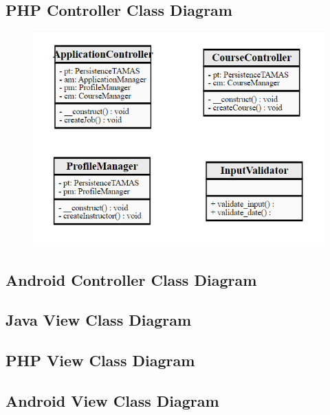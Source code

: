 \documentclass[12pt]{article}
\begin{document}
\subsection{PHP Controller Class Diagram}
\begin{figure}[H]
	\centering
	\includegraphics[]{ControllerPackageClassDiagramPHP.png}
\end{figure}
\subsection{Android Controller Class Diagram}
\subsection{Java View Class Diagram}
\subsection{PHP View Class Diagram}
\subsection{Android View Class Diagram}
\end{document}
